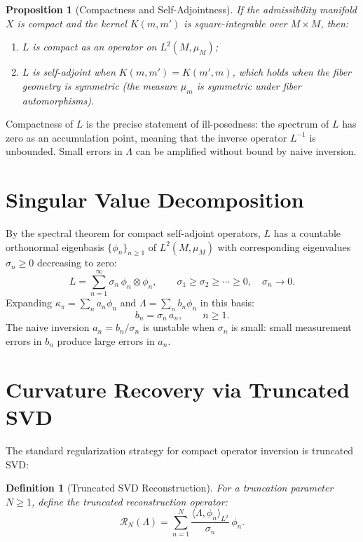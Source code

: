 \documentclass[12pt, oneside]{book}
\theoremstyle{plain-flyxion}
\newtheorem{proposition}[theorem]{Proposition}
\theoremstyle{definition-flyxion}
\newtheorem{definition}[theorem]{Definition}
\newcommand{\kpi}{\kappa_{\pi}}
\newcommand{\Lam}{\Lambda}
\begin{document}
\begin{proposition}[Compactness and Self-Adjointness]\label{prop:L-props}
If the admissibility manifold $X$ is compact and the kernel $K(m,m')$ is square-integrable
over $M \times M$, then:
\begin{enumerate}
  \item[(i)] $L$ is compact as an operator on $L^2(M, \mu_M)$;
  \item[(ii)] $L$ is self-adjoint when $K(m,m') = K(m',m)$, which holds when the fiber
    geometry is symmetric (the measure $\mu_m$ is symmetric under fiber automorphisms).
\end{enumerate}
\end{proposition}

Compactness of $L$ is the precise statement of ill-posedness: the spectrum of $L$ has
zero as an accumulation point, meaning that the inverse operator $L^{-1}$ is unbounded.
Small errors in $\Lam$ can be amplified without bound by naive inversion.

\section{Singular Value Decomposition}

By the spectral theorem for compact self-adjoint operators, $L$ has a countable
orthonormal eigenbasis $\{\phi_n\}_{n \geq 1}$ of $L^2(M, \mu_M)$ with corresponding
eigenvalues $\sigma_n \geq 0$ decreasing to zero:
\begin{equation}\label{eq:svd}
L = \sum_{n=1}^\infty \sigma_n\, \phi_n \otimes \phi_n,
\qquad \sigma_1 \geq \sigma_2 \geq \cdots \geq 0, \quad \sigma_n \to 0.
\end{equation}
Expanding $\kpi = \sum_n a_n \phi_n$ and $\Lam = \sum_n b_n \phi_n$ in this basis:
\[
b_n = \sigma_n\, a_n, \qquad n \geq 1.
\]
The naive inversion $a_n = b_n / \sigma_n$ is unstable when $\sigma_n$ is small: small
measurement errors in $b_n$ produce large errors in $a_n$.

\section{Curvature Recovery via Truncated SVD}

The standard regularization strategy for compact operator inversion is truncated SVD:

\begin{definition}[Truncated SVD Reconstruction]\label{def:tsvd}
For a truncation parameter $N \geq 1$, define the truncated reconstruction operator:
\begin{equation}\label{eq:tsvd}
\mathcal{R}_N(\Lam) = \sum_{n=1}^N \frac{\langle \Lam, \phi_n\rangle_{L^2}}{\sigma_n}\, \phi_n.
\end{equation}
\end{definition}
\end{document}
